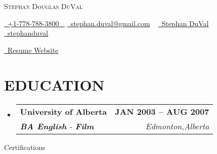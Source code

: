 \documentclass[letterpaper,11pt]{article}
\makeatletter
\newcommand{\resumeSubheading}[4]{
  \vspace{-2pt}\item
    \begin{tabular*}{1.0\textwidth}[t]{l@{\extracolsep{\fill}}r}
      \textbf{\large#1} & \textbf{\small #2} \\
      \textit{\large#3} & \textit{\small #4} \\
      
    \end{tabular*}\vspace{-3pt}
}
\newcommand{\resumeSubHeadingListStart}{\begin{itemize}[leftmargin=0.0in, label={}]}
\newcommand{\resumeSubHeadingListEnd}{\end{itemize}}
\makeatother
\begin{document}


\begin{center}
  {\Huge \scshape Stephan Douglas DuVal} \\ \vspace{1pt}

  \small
  \href{tel:+17787883800}{ \raisebox{-0.1\height}\faPhone\ \underline{+1-778-788-3800} ~} \href{mailto:stephan.duval@gmail.com}{\raisebox{-0.2\height}\faEnvelope\  \underline{stephan.duval@gmail.com}} ~
  \href{https://www.linkedin.com/in/stephanduval/}{\raisebox{-0.2\height}\faLinkedinSquare\ \underline{Stephan DuVal}}  ~
  \href{https://github.com/stephanduval}{\raisebox{-0.2\height}\faGithub\ \underline{stephanduval}} ~

  \href{https://stephan-duval-developer.vercel.app/}{\raisebox{-0.2\height}\faUser\  \underline{Resume Website}} ~






\end{center}

\hspace{20 mm}

\section{EDUCATION}
\resumeSubHeadingListStart
\resumeSubheading
{University of Alberta}{JAN 2003 -- AUG 2007}
{\textbf{BA English} - \textbf{Film}}{Edmonton,Alberta}
\resumeSubHeadingListEnd


{Certifications}
\end{document}
